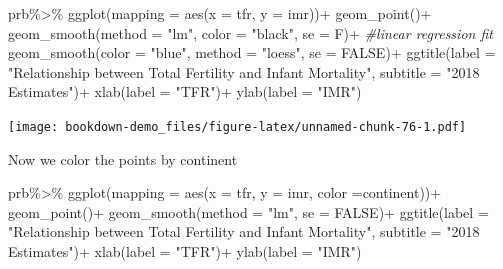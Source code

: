 \documentclass[
]{article}
\newenvironment{Shaded}{\begin{snugshade}}{\end{snugshade}}
\newcommand{\AttributeTok}[1]{\textcolor[rgb]{0.77,0.63,0.00}{#1}}
\newcommand{\CommentTok}[1]{\textcolor[rgb]{0.56,0.35,0.01}{\textit{#1}}}
\newcommand{\ConstantTok}[1]{\textcolor[rgb]{0.00,0.00,0.00}{#1}}
\newcommand{\FunctionTok}[1]{\textcolor[rgb]{0.00,0.00,0.00}{#1}}
\newcommand{\NormalTok}[1]{#1}
\newcommand{\SpecialCharTok}[1]{\textcolor[rgb]{0.00,0.00,0.00}{#1}}
\newcommand{\StringTok}[1]{\textcolor[rgb]{0.31,0.60,0.02}{#1}}
\begin{document}
\begin{Shaded}
\begin{Highlighting}[]
\NormalTok{prb}\SpecialCharTok{\%\textgreater{}\%}
\FunctionTok{ggplot}\NormalTok{(}\AttributeTok{mapping =} \FunctionTok{aes}\NormalTok{(}\AttributeTok{x =}\NormalTok{ tfr,}
                    \AttributeTok{y =}\NormalTok{ imr))}\SpecialCharTok{+}
  \FunctionTok{geom\_point}\NormalTok{()}\SpecialCharTok{+}
  \FunctionTok{geom\_smooth}\NormalTok{(}\AttributeTok{method =} \StringTok{"lm"}\NormalTok{,}
              \AttributeTok{color =} \StringTok{"black"}\NormalTok{,}
              \AttributeTok{se =}\NormalTok{ F)}\SpecialCharTok{+} \CommentTok{\#linear regression fit}
  \FunctionTok{geom\_smooth}\NormalTok{(}\AttributeTok{color =} \StringTok{"blue"}\NormalTok{,}
              \AttributeTok{method =} \StringTok{"loess"}\NormalTok{,}
              \AttributeTok{se =} \ConstantTok{FALSE}\NormalTok{)}\SpecialCharTok{+}
  \FunctionTok{ggtitle}\NormalTok{(}\AttributeTok{label =} \StringTok{"Relationship between Total Fertility and Infant Mortality"}\NormalTok{,}
          \AttributeTok{subtitle =} \StringTok{"2018 Estimates"}\NormalTok{)}\SpecialCharTok{+}
  \FunctionTok{xlab}\NormalTok{(}\AttributeTok{label =} \StringTok{"TFR"}\NormalTok{)}\SpecialCharTok{+}
  \FunctionTok{ylab}\NormalTok{(}\AttributeTok{label =} \StringTok{"IMR"}\NormalTok{)}
\end{Highlighting}
\end{Shaded}

\texttt{[image: bookdown-demo\_files/figure-latex/unnamed-chunk-76-1.pdf]}

Now we color the points by continent

\begin{Shaded}
\begin{Highlighting}[]
\NormalTok{prb}\SpecialCharTok{\%\textgreater{}\%}
\FunctionTok{ggplot}\NormalTok{(}\AttributeTok{mapping =} \FunctionTok{aes}\NormalTok{(}\AttributeTok{x =}\NormalTok{ tfr, }
                     \AttributeTok{y =}\NormalTok{ imr,}
                     \AttributeTok{color =}\NormalTok{continent))}\SpecialCharTok{+}
  \FunctionTok{geom\_point}\NormalTok{()}\SpecialCharTok{+}
  \FunctionTok{geom\_smooth}\NormalTok{(}\AttributeTok{method =} \StringTok{"lm"}\NormalTok{,}
              \AttributeTok{se =} \ConstantTok{FALSE}\NormalTok{)}\SpecialCharTok{+}
  \FunctionTok{ggtitle}\NormalTok{(}\AttributeTok{label =} \StringTok{"Relationship between Total Fertility and Infant Mortality"}\NormalTok{,}
          \AttributeTok{subtitle =} \StringTok{"2018 Estimates"}\NormalTok{)}\SpecialCharTok{+}
  \FunctionTok{xlab}\NormalTok{(}\AttributeTok{label =} \StringTok{"TFR"}\NormalTok{)}\SpecialCharTok{+}
  \FunctionTok{ylab}\NormalTok{(}\AttributeTok{label =} \StringTok{"IMR"}\NormalTok{)}
\end{Highlighting}
\end{Shaded}
\end{document}
